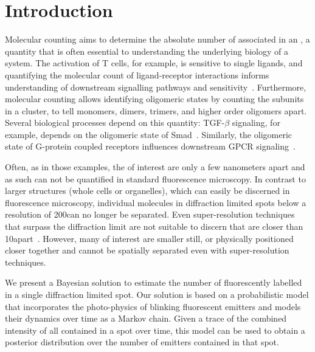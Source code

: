 \section{Introduction}



%
Molecular counting aims to determine the absolute number of \smallobjects
associated in an \object, a quantity that is often essential to understanding
the underlying biology of a system.
  The activation of T cells, for example, is sensitive to single ligands, and
  quantifying the molecular count of ligand-receptor interactions informs
  understanding of downstream signalling pathways and
  sensitivity~\citep{irvine_2002}.
  Furthermore, molecular counting allows identifying oligomeric states by
  counting the subunits in a cluster, to tell monomers, dimers,
  trimers, and higher order oligomers apart.
  Several biological processes depend on this quantity: TGF-$\beta$ signaling,
  for example, depends on the oligomeric state of Smad~\citep{inman_2002,
  moustakas_2002}.
  Similarly, the oligomeric state of G-protein coupled receptors influences
  downstream GPCR signaling~\citep{felce_2018, breitwieser_2004}.

%
Often, as in those examples, the \smallobjects of interest are only a few
nanometers apart and as such can not be quantified in standard fluorescence
microscopy.
  In contrast to larger structures (whole cells or organelles), which can
  easily be discerned in fluorescence microscopy, individual molecules in
  diffraction limited spots below a resolution of 200\nanometer can no longer
  be separated.
  Even super-resolution techniques~\citep{betzig_2006,rust_2006} that surpass
  the diffraction limit are not suitable to discern \smallobjects that are
  closer than 10\nanometer apart~\citep{valli_seeing_2021}.
  However, many \objects of interest are smaller still, or physically
  positioned closer together and cannot be spatially separated even with
  super-resolution techniques.

%
We present a Bayesian solution to estimate the number of fluorescently labelled
\smallobjects in a single diffraction limited spot.
  Our solution is based on a probabilistic model that incorporates the
  photo-physics of blinking fluorescent emitters and models their dynamics over
  time as a Markov chain.
  Given a trace of the combined intensity of all \smallobjects contained in a
  spot over time, this model can be used to obtain a posterior distribution
  over the number of emitters contained in that spot.

